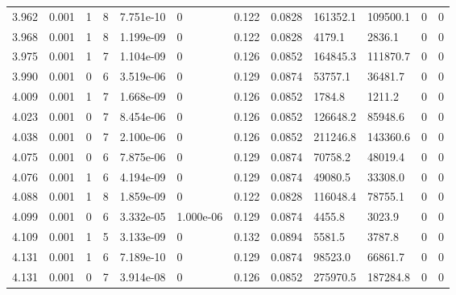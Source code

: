 \documentclass[preview]{standalone}
\begin{document}
{{{{\begin{tabular}{L{1.2cm}C{1.2cm} C{0.3cm}C{0.5cm} C{1.4cm}C{1.4cm} C{1.4cm}C{1.4cm} C{1.6cm}C{1.6cm} C{1.6cm}C{1.6cm}}
  3.962  &  0.001  & 1     &  8 &  7.751e-10  & 0  &  0.122&   0.0828& 161352.1 & 109500.1   &  0 & 0  \\ 
  3.968  &  0.001  & 1     &  8 &  1.199e-09  & 0  &  0.122&   0.0828& 4179.1 & 2836.1   &  0 & 0  \\ 
  3.975  &  0.001  & 1     &  7 &  1.104e-09  & 0  &  0.126&   0.0852& 164845.3 & 111870.7   &  0 & 0  \\ 
  3.990  &  0.001  & 0     &  6 &  3.519e-06  & 0  &  0.129&   0.0874& 53757.1 & 36481.7   &  0 & 0  \\ 
  4.009  &  0.001  & 1     &  7 &  1.668e-09  & 0  &  0.126&   0.0852& 1784.8 & 1211.2   &  0 & 0  \\ 
  4.023  &  0.001  & 0     &  7 &  8.454e-06  & 0  &  0.126&   0.0852& 126648.2 & 85948.6   &  0 & 0  \\ 
  4.038  &  0.001  & 0     &  7 &  2.100e-06  & 0  &  0.126&   0.0852& 211246.8 & 143360.6   &  0 & 0  \\ 
  4.075  &  0.001  & 0     &  6 &  7.875e-06  & 0  &  0.129&   0.0874& 70758.2 & 48019.4   &  0 & 0  \\ 
  4.076  &  0.001  & 1     &  6 &  4.194e-09  & 0  &  0.129&   0.0874& 49080.5 & 33308.0   &  0 & 0  \\ 
  4.088  &  0.001  & 1     &  8 &  1.859e-09  & 0  &  0.122&   0.0828& 116048.4 & 78755.1   &  0 & 0  \\ 
  4.099  &  0.001  & 0     &  6 &  3.332e-05  & 1.000e-06  &  0.129&   0.0874& 4455.8 & 3023.9   &  0 & 0  \\ 
  4.109  &  0.001  & 1     &  5 &  3.133e-09  & 0  &  0.132&   0.0894& 5581.5 & 3787.8   &  0 & 0  \\ 
  4.131  &  0.001  & 1     &  6 &  7.189e-10  & 0  &  0.129&   0.0874& 98523.0 & 66861.7   &  0 & 0  \\ 
  4.131  &  0.001  & 0     &  7 &  3.914e-08  & 0  &  0.126&   0.0852& 275970.5 & 187284.8   &  0 & 0  \\ 
\hline 
\end{tabular} 

}}}}
\end{document}
